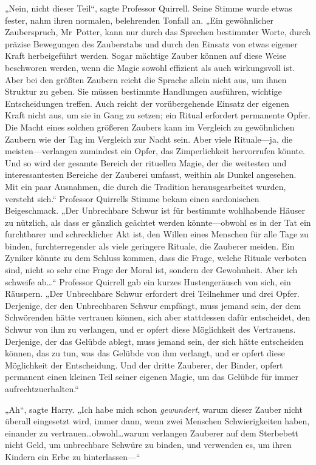 „Nein, nicht dieser Teil“, sagte Professor Quirrell. Seine Stimme wurde etwas fester, nahm ihren normalen, belehrenden Tonfall an. „Ein gewöhnlicher Zauberspruch, Mr~Potter, kann nur durch das Sprechen bestimmter Worte, durch präzise Bewegungen des Zauberstabs und durch den Einsatz von etwas eigener Kraft herbeigeführt werden. Sogar mächtige Zauber können auf diese Weise beschworen werden, wenn die Magie sowohl effizient als auch wirkungsvoll ist. Aber bei den größten Zaubern reicht die Sprache allein nicht aus, um ihnen Struktur zu geben. Sie müssen bestimmte Handlungen ausführen, wichtige Entscheidungen treffen. Auch reicht der vorübergehende Einsatz der eigenen Kraft nicht aus, um sie in Gang zu setzen; ein Ritual erfordert permanente Opfer. Die Macht eines solchen größeren Zaubers kann im Vergleich zu gewöhnlichen Zaubern wie der Tag im Vergleich zur Nacht sein. Aber viele Rituale—ja, die meisten—verlangen zumindest ein Opfer, das Zimperlichkeit hervorrufen könnte. Und so wird der gesamte Bereich der rituellen Magie, der die weitesten und interessantesten Bereiche der Zauberei umfasst, weithin als Dunkel angesehen. Mit ein paar Ausnahmen, die durch die Tradition herausgearbeitet wurden, versteht sich.“ Professor Quirrells Stimme bekam einen sardonischen Beigeschmack. „Der Unbrechbare Schwur ist für bestimmte wohlhabende Häuser zu nützlich, als dass er gänzlich geächtet werden könnte—obwohl es in der Tat ein furchtbarer und schrecklicher Akt ist, den Willen eines Menschen für alle Tage zu binden, furchterregender als viele geringere Rituale, die Zauberer meiden. Ein Zyniker könnte zu dem Schluss kommen, dass die Frage, welche Rituale verboten sind, nicht so sehr eine Frage der Moral ist, sondern der Gewohnheit. Aber ich schweife ab…“ Professor Quirrell gab ein kurzes Hustengeräusch von sich, ein Räuspern. „Der Unbrechbare Schwur erfordert drei Teilnehmer und drei Opfer. Derjenige, der den Unbrechbaren Schwur empfängt, muss jemand sein, der dem Schwörenden hätte vertrauen können, sich aber stattdessen dafür entscheidet, den Schwur von ihm zu verlangen, und er opfert diese Möglichkeit des Vertrauens. Derjenige, der das Gelübde ablegt, muss jemand sein, der sich hätte entscheiden können, das zu tun, was das Gelübde von ihm verlangt, und er opfert diese Möglichkeit der Entscheidung. Und der dritte Zauberer, der Binder, opfert permanent einen kleinen Teil seiner eigenen Magie, um das Gelübde für immer aufrechtzuerhalten.“

„Ah“, sagte Harry. „Ich habe mich schon \emph{gewundert}, warum dieser Zauber nicht überall eingesetzt wird, immer dann, wenn zwei Menschen Schwierigkeiten haben, einander zu vertrauen…obwohl…warum verlangen Zauberer auf dem Sterbebett nicht Geld, um unbrechbare Schwüre zu binden, und verwenden es, um ihren Kindern ein Erbe zu hinterlassen—“

